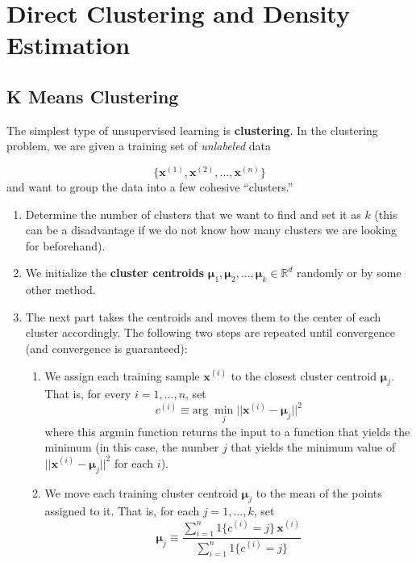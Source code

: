 \section{Direct Clustering and Density Estimation} 

  \subsection{K Means Clustering} 

    The simplest type of unsupervised learning is \textbf{clustering}. In the clustering problem, we are given a training set of \textit{unlabeled} data

    \begin{equation}
      \{ \mathbf{x}^{(1)}, \mathbf{x}^{(2)}, \ldots, \mathbf{x}^{(n)}\}
    \end{equation}
    and want to group the data into a few cohesive ``clusters.''

    \begin{enumerate}
      \item Determine the number of clusters that we want to find and set it as $k$ (this can be a disadvantage if we do not know how many clusters we are looking for beforehand).

      \item We initialize the \textbf{cluster centroids} $\boldsymbol{\mu}_1, \boldsymbol{\mu}_2, \ldots, \boldsymbol{\mu}_k \in \mathbb{R}^d$ randomly or by some other method.

      \item The next part takes the centroids and moves them to the center of each cluster accordingly. The following two steps are repeated until convergence (and convergence is guaranteed):
        \begin{enumerate}
          \item We assign each training sample $\mathbf{x}^{(i)}$ to the closest cluster centroid $\boldsymbol{\mu}_j$. That is, for every $i = 1, \ldots, n$, set
            \begin{equation}
              c^{(i)} \equiv \text{arg}\; \min_j || \mathbf{x}^{(i)} - \boldsymbol{\mu}_j ||^2
            \end{equation}
          where this $\text{argmin}$ function returns the input to a function that yields the minimum (in this case, the number $j$ that yields the minimum value of $|| \mathbf{x}^{(i)} - \boldsymbol{\mu}_j ||^2$ for each $i$).

          \item We move each training cluster centroid $\boldsymbol{\mu}_j$ to the mean of the points assigned to it. That is, for each $j = 1, \ldots, k$, set 
            \begin{equation}
              \boldsymbol{\mu}_j \equiv \frac{\sum_{i=1}^n 1\{c^{(i)} = j\}\, \mathbf{x}^{(i)}}{\sum_{i=1}^n 1 \{c^{(i)} = j\}}
            \end{equation}
        \end{enumerate}
    \end{enumerate}

